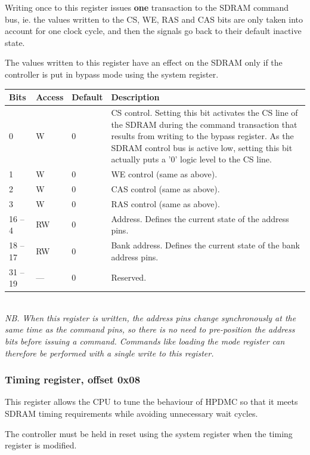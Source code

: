 \documentclass[a4paper,11pt]{article}
\begin{document}
Writing once to this register issues \textbf{one} transaction to the SDRAM command bus, ie. the values written to the CS, WE, RAS and CAS bits are only taken into account for one clock cycle, and then the signals go back to their default inactive state.

The values written to this register have an effect on the SDRAM only if the controller is put in bypass mode using the system register.\\

\begin{tabularx}{\textwidth}{|l|l|l|X|}
\hline
\bf Bits & \bf Access & \bf Default & \bf Description \\
\hline
0 & W & 0 & CS control. Setting this bit activates the CS line of the SDRAM during the command transaction that results from writing to the bypass register. As the SDRAM control bus is active low, setting this bit actually puts a '0' logic level to the CS line. \\
\hline
1 & W & 0 & WE control (same as above). \\
\hline
2 & W & 0 & CAS control (same as above). \\
\hline
3 & W & 0 & RAS control (same as above). \\
\hline
16 -- 4 & RW & 0 & Address. Defines the current state of the address pins. \\
\hline
18 -- 17 & RW & 0 & Bank address. Defines the current state of the bank address pins. \\
\hline
31 -- 19 & --- & 0 & Reserved. \\
\hline
\end{tabularx}\\

\textit{NB. When this register is written, the address pins change synchronously at the same time as the command pins, so there is no need to pre-position the address bits before issuing a command. Commands like loading the mode register can therefore be performed with a single write to this register.}

\subsubsection{Timing register, offset 0x08}
This register allows the CPU to tune the behaviour of HPDMC so that it meets SDRAM timing requirements while avoiding unnecessary wait cycles.

The controller must be held in reset using the system register when the timing register is modified.\\
\end{document}
